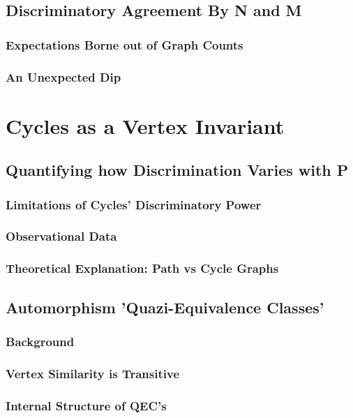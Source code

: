 \documentclass[11pt,a4paper]{report}
\begin{document}
\section{Discriminatory Agreement By N and M}
\subsection{Expectations Borne out of Graph Counts}
\subsection{An Unexpected Dip}



\chapter{Cycles as a Vertex Invariant}

\section{Quantifying how Discrimination Varies with P}
\subsection{Limitations of Cycles' Discriminatory Power}
\subsection{Observational Data}
\subsection{Theoretical Explanation: Path vs Cycle Graphs}

\section{Automorphism 'Quazi-Equivalence Classes'}
\subsection{Background}
\subsection{Vertex Similarity is Transitive}
\subsection{Internal Structure of QEC's}
\end{document}
